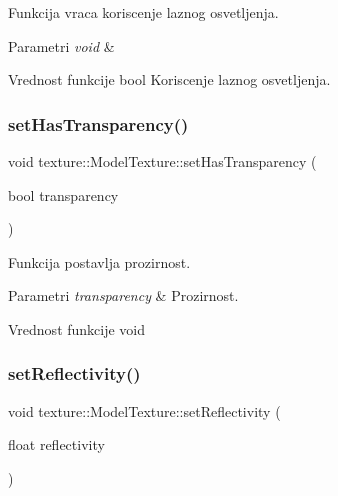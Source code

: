 Funkcija vraca koriscenje laznog osvetljenja. 


\begin{DoxyParams}{Parametri}
{\em void} & \\
\hline
\end{DoxyParams}
\begin{DoxyReturn}{Vrednost funkcije}
bool Koriscenje laznog osvetljenja. 
\end{DoxyReturn}
\mbox{\label{classtexture_1_1Texture_a04240906ba55ecaaec9a793788da9c58}} 
\subsubsection{\texorpdfstring{set\+Has\+Transparency()}{setHasTransparency()}}
{\footnotesize\ttfamily void texture\+::\+Model\+Texture\+::set\+Has\+Transparency (\begin{DoxyParamCaption}\item[{bool}]{transparency }\end{DoxyParamCaption})}



Funkcija postavlja prozirnost. 


\begin{DoxyParams}{Parametri}
{\em transparency} & Prozirnost. \\
\hline
\end{DoxyParams}
\begin{DoxyReturn}{Vrednost funkcije}
void 
\end{DoxyReturn}
\mbox{\label{classtexture_1_1Texture_a87d88c1857f107c1169b24d1488f5cbc}} 
\subsubsection{\texorpdfstring{set\+Reflectivity()}{setReflectivity()}}
{\footnotesize\ttfamily void texture\+::\+Model\+Texture\+::set\+Reflectivity (\begin{DoxyParamCaption}\item[{float}]{reflectivity }\end{DoxyParamCaption})}



